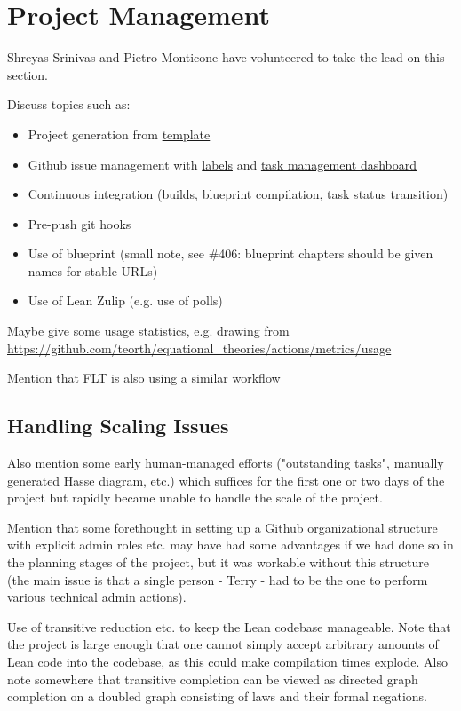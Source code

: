 
\section{Project Management}


Shreyas Srinivas and Pietro Monticone have volunteered to take the lead on this section.

Discuss topics such as:
\begin{itemize}
    \item Project generation from \href{https://github.com/pitmonticone/LeanProject}{template}
    \item Github issue management with \href{https://github.com/teorth/equational_theories/labels}{labels} and \href{https://github.com/users/teorth/projects/1}{task management dashboard}
    \item Continuous integration (builds, blueprint compilation, task status transition)
    \item Pre-push git hooks
    \item Use of blueprint (small note, see \#406: blueprint chapters should be given names for stable URLs)
    \item Use of Lean Zulip (e.g. use of polls)
\end{itemize}

Maybe give some usage statistics, e.g. drawing from \url{https://github.com/teorth/equational_theories/actions/metrics/usage}

Mention that FLT is also using a similar workflow

\subsection{Handling Scaling Issues}

Also mention some early human-managed efforts ("outstanding tasks", manually generated Hasse diagram, etc.) which suffices for the first one or two days of the project but rapidly became unable to handle the scale of the project.

Mention that some forethought in setting up a Github organizational structure with explicit admin roles etc. may have had some advantages if we had done so in the planning stages of the project, but it was workable without this structure (the main issue is that a single person - Terry - had to be the one to perform various technical admin actions).

Use of transitive reduction etc. to keep the Lean codebase manageable. Note that the project is large enough that one cannot simply accept arbitrary amounts of Lean code into the codebase, as this could make compilation times explode. Also note somewhere that transitive completion can be viewed as directed graph completion on a doubled graph consisting of laws and their formal negations.

